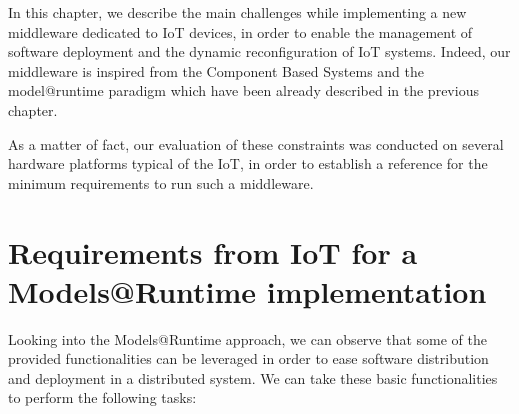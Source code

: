 
In this chapter, we describe the main challenges while implementing a new middleware dedicated to IoT devices, in order to enable the management of software deployment and the dynamic reconfiguration of IoT systems.
Indeed, our middleware is inspired from the Component Based Systems and the model@runtime paradigm which have been already described in the previous chapter.

As a matter of fact, our evaluation of these constraints was conducted on several hardware platforms typical of the IoT, in order to establish a reference for the minimum requirements to run such a middleware.

\section{Requirements from IoT  for a Models@Runtime implementation}
\label{sec:MARMech4IoT}
Looking into the Models@Runtime approach, we can observe that some of the provided functionalities can be leveraged in order to ease software distribution and deployment in a distributed system.
We can take these basic functionalities to perform the following tasks:

